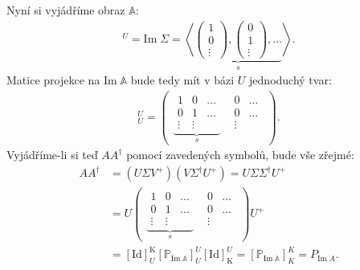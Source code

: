 \documentclass[]{article}
\renewcommand{\Im}{\mathrm{Im}\;}
\newcommand{\Id}[2]{\ensuremath{[\mathrm{Id}]_{#1}^{#2}}}
\newcommand{\mat}[1]{\begin{pmatrix}#1\end{pmatrix}}
\begin{document}
Nyní si vyjádříme obraz $\mathbb{A}$:
\begin{align*}
  [\Im\mathbb{A}]^U = \Im \Sigma =
  \left\langle
    \underbrace{
      \mat{1 \\ 0 \\ \vdots},
      \mat{0 \\ 1 \\ \vdots},
      \dots
    }_s
  \right\rangle.
\end{align*}
Matice projekce na $\Im\mathbb{A}$ bude tedy mít v bázi $U$ jednoduchý tvar:
\begin{align*}
  [\mathbb{P}_{\Im\mathbb{A}}]_U^U =
  \mat{
    \underbrace{
      \begin{matrix}
        1 & 0 & \dots \\
        0 & 1 & \dots \\
        \vdots & \vdots
      \end{matrix}
    }_s
    &
    \begin{matrix}
      0 & \dots \\
      0 & \dots \\
      \vdots
    \end{matrix}
  }.
\end{align*}
Vyjádříme-li si teď $A A^\dagger$ pomocí zavedených symbolů, bude vše zřejmé:
\begin{align*}
  A A^\dagger
  &= (U \Sigma V^+)(V \Sigma^\dagger U^+) = U \Sigma \Sigma^\dagger U^+ \\
  &= U \mat{
    \underbrace{
      \begin{matrix}
        1 & 0 & \dots \\
        0 & 1 & \dots \\
        \vdots & \vdots
      \end{matrix}
    }_s
    &
    \begin{matrix}
      0 & \dots \\
      0 & \dots \\
      \vdots
    \end{matrix}
  } U^+ \\
  &= \Id{U}{\mathrm{K}} [\mathbb{P}_{\Im\mathbb{A}}]_U^U \Id{\mathrm{K}}{U}
  = [\mathbb{P}_{\Im\mathbb{A}}]_K^K = P_{\Im A}.
\end{align*}
\end{document}
